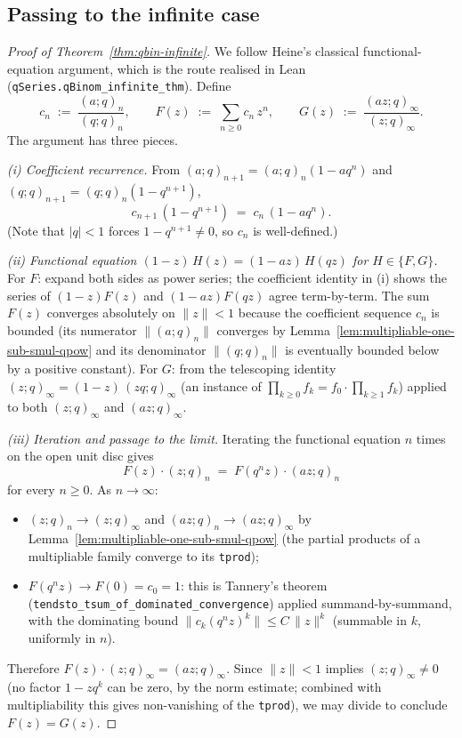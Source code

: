 \subsection{Passing to the infinite case}

\begin{proof}[Proof of Theorem~\ref{thm:qbin-infinite}]
We follow Heine's classical functional-equation argument, which is the route
realised in Lean (\texttt{qSeries.qBinom\_infinite\_thm}). Define
\[
  c_n \;:=\; \frac{(a;q)_n}{(q;q)_n}, \qquad
  F(z) \;:=\; \sum_{n \ge 0} c_n\, z^n, \qquad
  G(z) \;:=\; \frac{(a z;q)_\infty}{(z;q)_\infty}.
\]
The argument has three pieces.

\emph{(i) Coefficient recurrence.} From $(a;q)_{n+1} = (a;q)_n(1 - a q^n)$ and
$(q;q)_{n+1} = (q;q)_n(1 - q^{n+1})$,
\[
  c_{n+1}\,(1 - q^{n+1}) \;=\; c_n\,(1 - a q^n).
\]
(Note that $|q| < 1$ forces $1 - q^{n+1} \neq 0$, so $c_n$ is well-defined.)

\emph{(ii) Functional equation $(1-z)\,H(z) = (1-az)\,H(qz)$ for $H \in \{F, G\}$.}
For $F$: expand both sides as power series; the coefficient identity in (i)
shows the series of $(1-z) F(z)$ and $(1-az) F(qz)$ agree term-by-term. The
sum $F(z)$ converges absolutely on $\|z\| < 1$ because the coefficient
sequence $c_n$ is bounded (its numerator $\|(a;q)_n\|$ converges by
Lemma~\ref{lem:multipliable-one-sub-smul-qpow} and its denominator $\|(q;q)_n\|$
is eventually bounded below by a positive constant).
For $G$: from the telescoping identity $(z;q)_\infty = (1-z)\,(zq;q)_\infty$
(an instance of $\prod_{k\ge 0} f_k = f_0 \cdot \prod_{k\ge 1} f_k$) applied
to both $(z;q)_\infty$ and $(az;q)_\infty$.

\emph{(iii) Iteration and passage to the limit.} Iterating the functional
equation $n$ times on the open unit disc gives
\[
  F(z) \cdot (z;q)_n \;=\; F(q^n z) \cdot (a z;q)_n
\]
for every $n \ge 0$. As $n \to \infty$:
\begin{itemize}
  \item $(z;q)_n \to (z;q)_\infty$ and $(az;q)_n \to (az;q)_\infty$ by
    Lemma~\ref{lem:multipliable-one-sub-smul-qpow} (the partial products of a
    multipliable family converge to its \texttt{tprod});
  \item $F(q^n z) \to F(0) = c_0 = 1$: this is Tannery's theorem
    (\texttt{tendsto\_tsum\_of\_dominated\_convergence}) applied summand-by-summand,
    with the dominating bound $\|c_k (q^n z)^k\| \le C\,\|z\|^k$ (summable in
    $k$, uniformly in $n$).
\end{itemize}
Therefore $F(z) \cdot (z;q)_\infty = (a z;q)_\infty$. Since $\|z\| < 1$
implies $(z;q)_\infty \neq 0$ (no factor $1 - z q^k$ can be zero, by the
norm estimate; combined with multipliability this gives non-vanishing of the
\texttt{tprod}), we may divide to conclude $F(z) = G(z)$. \qedhere
\end{proof}

